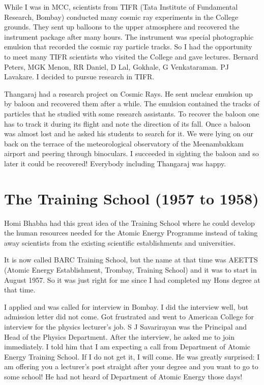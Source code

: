 While I was in MCC, scientists from TIFR (Tata Institute of Fundamental 
Research, Bombay) conducted many cosmic ray experiments in the College 
grounds. They sent up balloons to the upper atmosphere and recovered the 
instrument package after many hours. The instrument was special 
photographic emulsion that recorded the cosmic ray particle tracks. So I 
had the opportu\-nity to meet many TIFR scientists who visited the College 
and gave lectures. Bernard Peters, MGK Menon, RR Daniel, D Lal, Gokhale, 
G Venkataraman. PJ Lavakare. I decided to pursue research in TIFR.

Thangaraj had a research project on Cosmic Rays. He sent nuclear 
emulsion up by baloon and recovered them after a while. The emulsion 
contained the tracks of particles that he studied with some research 
assistants. To recover the baloon one has to track it during its flight 
and note the direction of its fall. Once a baloon was almost lost and he 
asked his students to search for it. We were lying on our back on the 
terrace of the meteorological observatory of the Meenambakkam airport 
and peering through binoculars. I succeeded in sighting the baloon and 
so later it could be recovered! Everybody including Thangaraj was happy.

\section*{The Training School (1957 to 1958)}

Homi Bhabha had this great idea of the Training School where he could develop the human resources needed for the Atomic Energy Programme instead of taking away scientists from the existing scientific establishments and universities.   

It is now called BARC Training School, but the name at that time was AEETTS (Atomic Energy Establishment, Trombay, Training School) and it was to start in August 1957. So it was just right for me since I had completed my Hons degree at that time.

I applied and was called for interview in Bombay. I did the interview 
well, but admission letter did not come. Got frustrated and went to 
American College for interview for the physics lectu\-rer's job. S J 
Savarirayan was the Principal and Head of the Physics Department. After 
the interview, he asked me to join immediately. I told him that I am 
expecting a call from Department of Atomic Energy Training School. If I 
do not get it, I will come. He was greatly surprised: I am offering you 
a lecturer's post straight after your degree and you want to go to some 
school! He had not heard of Department of Atomic Energy those days! 

